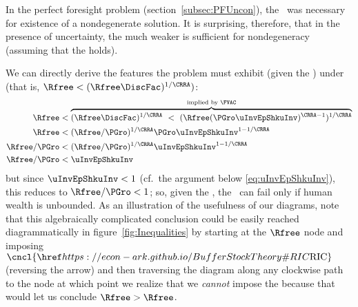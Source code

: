 \documentclass[BufferStockTheory]{subfiles}
\begin{document}
In the perfect foresight problem
(section~\ref{subsec:PFUncon}), the \RIC~was necessary for existence of
a nondegenerate solution.  It is surprising, therefore, that in the presence of uncertainty, the much weaker {\WRIC} is sufficient for nondegeneracy (assuming that the {\FVAC} holds).
\begin{comment}
  But if the \RIC~does hold, some useful results can be derived.  Arguably
  the most fundamental are that the limiting values
  for the minimal and maximal marginal propensities to consume implicit in
  \eqref{eq:MaxMPCInv} and \eqref{eq:MinMPCInv} are positive and finite.
\end{comment}
We can directly derive the features the problem must
exhibit (given the \FVAC) under \cncl{\RIC} (that is, $\Rfree < (\Rfree \DiscFac)^{1/\CRRA})$:
\begin{align}
  \Rfree   & < \overbrace{(\Rfree \DiscFac)^{1/\CRRA} ~ < ~ (\Rfree (\PGro \uInvEpShkuInv)^{\CRRA-1})^{1/\CRRA}}^{\text{implied by \FVAC}} \notag
  \\  \Rfree   & < (\Rfree/\PGro)^{1/\CRRA}\PGro \uInvEpShkuInv^{1-1/\CRRA} \notag
  \\  \Rfree/\PGro  & < (\Rfree/\PGro)^{1/\CRRA}\uInvEpShkuInv^{1-1/\CRRA} \notag
  \\  \Rfree/\PGro  & < \uInvEpShkuInv \label{eq:RICimplies}
\end{align}
but since $\uInvEpShkuInv < 1$ (cf.\ the argument below \eqref{eq:uInvEpShkuInv}), this reduces to $\Rfree/\PGro < 1$; so, given the \FVAC, the \RIC~can fail only if human wealth is unbounded.  As an illustration of the usefulness of our diagrams, note that this algebraically complicated conclusion could be easily reached diagrammatically in figure~\ref{fig:Inequalities} by starting at the $\Rfree$ node and imposing $\cncl{\RIC}$ (reversing the {\RIC} arrow) and then traversing the diagram along any clockwise path to the {\PFVAF} node at which point we realize that we \textit{cannot} impose the {\FHWC} because that would let us conclude $\Rfree > \Rfree$.
\end{document}
